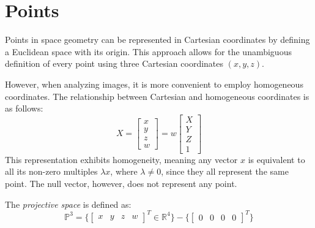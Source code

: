 \section{Points}

Points in space geometry can be represented in Cartesian coordinates by defining a Euclidean space with its origin. 
This approach allows for the unambiguous definition of every point using three Cartesian coordinates $(x, y, z)$.

However, when analyzing images, it is more convenient to employ homogeneous coordinates. 
The relationship between Cartesian and homogeneous coordinates is as follows:    \[
X =
\begin{bmatrix}
    x \\
    y \\
    z \\
    w
\end{bmatrix}
=w
\begin{bmatrix}
    X \\
    Y \\
    Z \\
    1 
\end{bmatrix}
\]
This representation exhibits homogeneity, meaning any vector $x$ is equivalent to all its non-zero multiples $\lambda x$, where $\lambda \neq 0$, since they all represent the same point.
The null vector, however, does not represent any point.
\begin{definition}
    The \emph{projective space} is defined as:
    \[\mathbb{P}^3=\{{\begin{bmatrix} x & y & z & w \end{bmatrix}}^T \in \mathbb{R}^4\}-\{{\begin{bmatrix} 0 & 0 & 0 & 0 \end{bmatrix}}^T\}\]
\end{definition}
